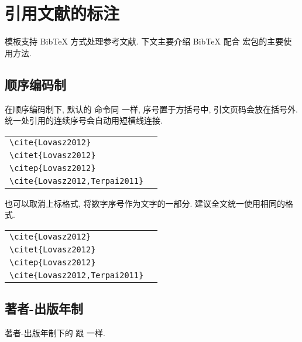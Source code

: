 
\chapter{引用文献的标注}

模板支持 BibTeX 方式处理参考文献. 下文主要介绍 BibTeX 配合  宏包的主要使用方法.


\section{顺序编码制}

在顺序编码制下, 默认的  命令同  一样, 序号置于方括号中, 
引文页码会放在括号外. 统一处引用的连续序号会自动用短横线连接.

{
\noindent
\begin{tabular}{l@{\quad$\Rightarrow$\quad}l}
  \verb|\cite{Lovasz2012}|               & \cite{Lovasz2012}               \\
  \verb|\citet{Lovasz2012}|              & \citet{Lovasz2012}              \\
  \verb|\citep{Lovasz2012}|              & \citep{Lovasz2012}              \\
  \verb|\cite{Lovasz2012,Terpai2011}|    & \cite{Lovasz2012,Terpai2011} \\
\end{tabular}}

也可以取消上标格式, 将数字序号作为文字的一部分. 建议全文统一使用相同的格式.

{
\noindent
\begin{tabular}{l@{\quad$\Rightarrow$\quad}l}
  \verb|\cite{Lovasz2012}|               & \cite{Lovasz2012}               \\
  \verb|\citet{Lovasz2012}|              & \citet{Lovasz2012}              \\
  \verb|\citep{Lovasz2012}|              & \citep{Lovasz2012}              \\
  \verb|\cite{Lovasz2012,Terpai2011}|    & \cite{Lovasz2012,Terpai2011} \\
\end{tabular}}


\section{著者-出版年制}

著者-出版年制下的  跟  一样.

